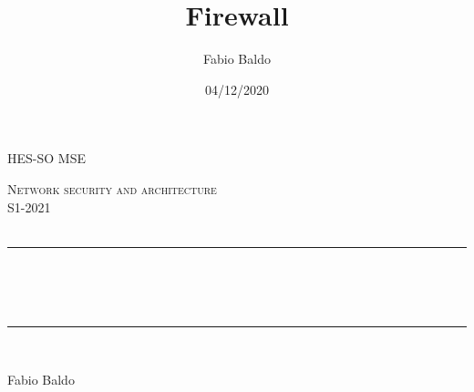 
\title{Firewall}													%
\author{Fabio Baldo}														%
\date{04/12/2020}														%



\makeatletter
\let\thetitle\@title
\let\theauthor\@author
\let\thedate\@date
\makeatother
\pagestyle{fancy}
\fancyhf{}
\rhead{\theauthor}
\lhead{\thetitle}
\cfoot{\thepage}
\newcommand{\mis}[3]{(#1 \pm #2) \ #3}
\newcommand{\misp}[3]{(#1 \#3 \pm #2}



\begin{titlepage}
	
    \begin{center}				
    \textsc{\LARGE HES-SO MSE}\\[2.0 cm]						%
    
        \vspace*{2.00 cm}
    
	\textsc{\Large Network security and architecture}\\[0.30 cm]		%
	\textsc{\Large S1-2021 }\\[0.5 cm]		%
	\textsc{\Large  }\\[0.5 cm] %
	\rule{\linewidth}{0.2 mm} \\[0.4 cm]
	{ \huge \bfseries \thetitle \\ \small \thedate}\\
	\rule{\linewidth}{0.2 mm} \\[1.5 cm]
	
    	\begin{center}
    	    Fabio Baldo
    	\end{center}
    	
	\end{center}
\end{titlepage}
